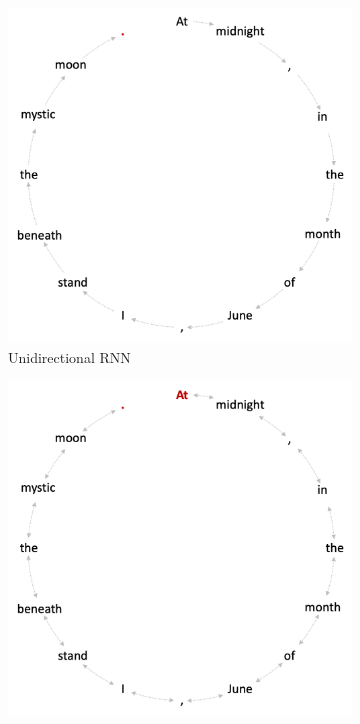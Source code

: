 \begin{figure}[htb!]
    \centering
    \begin{subfigure}[b]{0.475\textwidth}
        \centering
        \includegraphics[width=\columnwidth]{images/rnn_uni.png}
        \caption{Unidirectional RNN}
    \end{subfigure}
    \hfill
    \begin{subfigure}[b]{0.475\textwidth}  
        \centering 
        \includegraphics[width=\columnwidth]{images/rnn_bi.png}

\end{subfigure}
\end{figure}
